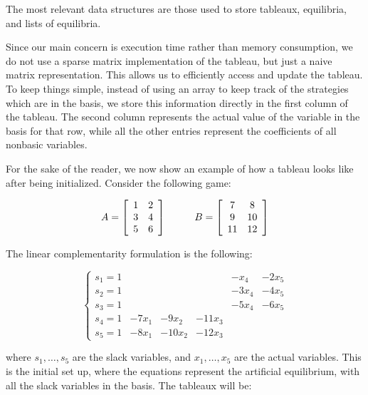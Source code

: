 \documentclass[11pt]{article}
\begin{document}
The most relevant data structures are those used to store tableaux,
equilibria, and lists of equilibria.

Since our main concern is execution time rather than memory
consumption, we do not use a sparse matrix implementation of the
tableau, but just a naive matrix representation. This allows us to
efficiently access and update the tableau. To keep things simple,
instead of using an array to keep track of the strategies which are
in the basis, we store this information directly in the first column
of the tableau. The second column represents the actual value of the
variable in the basis for that row, while all the other entries
represent the coefficients of all nonbasic variables.

For the sake of the reader, we now show an example of how a tableau
looks like after being initialized. Consider the following game:


\begin{equation*}\label{bim}
  A = \left[
    \begin{array}{ c c }
      1 & 2 \\
      3 & 4 \\
      5 & 6
    \end{array}
    \right]
  \hskip1cm B = \left[
    \begin{array}{c c}
      7 & 8\\
      9 & 10\\
      11 & 12
    \end{array}
    \right]
\end{equation*}

The linear complementarity formulation is the following:

\begin{equation*}
\left\{
  \begin{array}{llllll}
    s_1 = 1 & { } & { } & { } & -x_4 & -2x_5\\
    s_2 = 1 & { } & { } & { } & -3x_4 & -4x_5\\
    s_3 = 1 & { } & { } & { } & -5x_4 & -6x_5\\
    s_4 = 1 & -7x_1 & -9x_2 & -11x_3 & { } & { }\\
    s_5 = 1 & -8x_1 & -10x_2 & -12x_3 & { } & { }
  \end{array}
\right.
\end{equation*}

\noindent where $s_1,\ldots, s_5$ are the slack variables, and $x_1,
\ldots, x_5$ are the actual variables. This is the initial set up,
where the equations represent the artificial equilibrium, with all
the slack variables in the basis. The tableaux will be:
\end{document}
